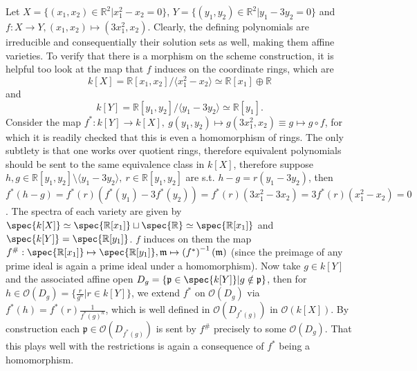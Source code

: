 \begin{example}
    Let \( X = \{ (x_1, x_2) \in \mathbb{R}^2 | x_1^2 - x_2 = 0 \} \), \( Y = \{ (y_1, y_2) \in \mathbb{R}^2 | y_1 - 3 y_2 = 0 \} \)
    and \( f : X \to Y, (x_1, x_2) \mapsto (3 x_1^2, x_2) \).
    Clearly, the defining polynomials are irreducible and consequentially their solution sets as well, making them affine varieties.
    To verify that there is a morphism on the scheme construction, it is helpful too look at the map that \( f \) induces on the coordinate rings,
    which are 
    \[ 
        k[X] = \mathbb{R}[x_1, x_2] / \langle x_1^2 - x_2 \rangle \simeq \mathbb{R}[x_1] \oplus \mathbb{R} 
    \]
    and 
    \[ 
        k[Y] = \mathbb{R}[y_1, y_2] / \langle y_1 - 3 y_2 \rangle \simeq \mathbb{R}[y_1].
    \]
    Consider the map \( f^\ast : k[Y] \to k[X],\ g(y_1, y_2) \mapsto g(3x_1^2, x_2) \equiv g \mapsto g \circ f \), for which it is readily 
    checked that this is even a homomorphism of rings. The only subtlety is that one works over quotient rings, therefore equivalent polynomials
    should be sent to the same equivalence class in \( k[X] \), therefore suppose 
    \( h, g \in \mathbb{R}[y_1, y_2] \setminus \langle y_1 - 3y_2 \rangle,\ r \in \mathbb{R}[y_1, y_2] \) are s.t. \( h - g = r(y_1 - 3 y_2) \),
    then \( f^\ast(h - g) = f^\ast(r)(f^\ast(y_1) - 3 f^\ast(y_2)) = f^\ast(r)(3 x_1^2 - 3 x_2) = 3f^\ast(r)(x_1^2 - x_2) = 0 \).
    \newline
    The spectra of each variety are given by \( \spec{k[X]} \simeq \spec{\mathbb{R}[x_1]} \sqcup \spec{\mathbb{R}} \simeq \spec{\mathbb{R}[x_1]} \)
    and \( \spec{k[Y]} = \spec{\mathbb{R}[y_1]} \).
    \( f \) induces on them the map 
    \( f^\# : \spec{\mathbb{R}[x_1]} \mapsto \spec{\mathbb{R}[y_1]} , \mathfrak{m} \mapsto \left(f^{\ast}\right)^{-1}(\mathfrak{m}) \)
    (since the preimage of any prime ideal is again a prime ideal under a homomorphism).
    Now take \( g \in k[Y] \) and the associated affine open \( D_g = \{ \mathfrak{p} \in \spec{k[Y]} | g \notin \mathfrak{p} \} \),
    then for \( h \in \mathcal{O}(D_g) = \{ \frac{r}{g^n} | r \in k[Y] \} \), we extend \( f^\ast \) on \( \mathcal{O}(D_g) \)
    via \( f^\ast(h) = f^\ast(r) \frac{1}{f^\ast(g)^n} \), which is well defined in \( \mathcal{O}(D_{f^\ast(g)}) \) in \( \mathcal{O}(k[X]) \).
    By construction each \( \mathfrak{p} \in \mathcal{O}(D_{f^\ast(g)}) \) is sent by \( f^\# \) precisely to some \( \mathcal{O}(D_g) \).
    That this plays well with the restrictions is again a consequence of \( f^\ast \) being a homomorphism.
    \newline

\end{example}
